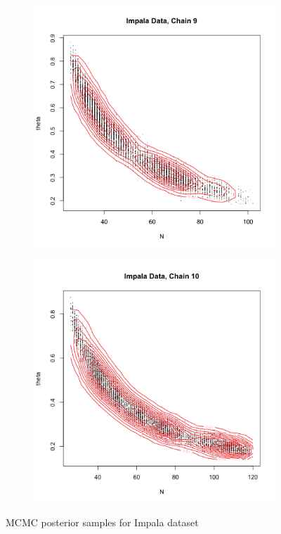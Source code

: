 \documentclass[10pt,psamsfonts]{amsart}
\theoremstyle{definition}
\theoremstyle{remark}
\numberwithin{equation}{section}
\begin{document}
\begin{figure}
\begin{subfigure}[b]{0.3\textwidth}
	\end{subfigure}
	\begin{subfigure}[b]{0.3\textwidth}
		\includegraphics[width=\textwidth]{wonlee_mcmc_impala_9.png}
	\end{subfigure}
	\begin{subfigure}[b]{0.3\textwidth}
		\includegraphics[width=\textwidth]{wonlee_mcmc_impala_10.png}
	\end{subfigure}
	\caption{MCMC posterior samples for Impala dataset}
\end{figure}
\end{document}
